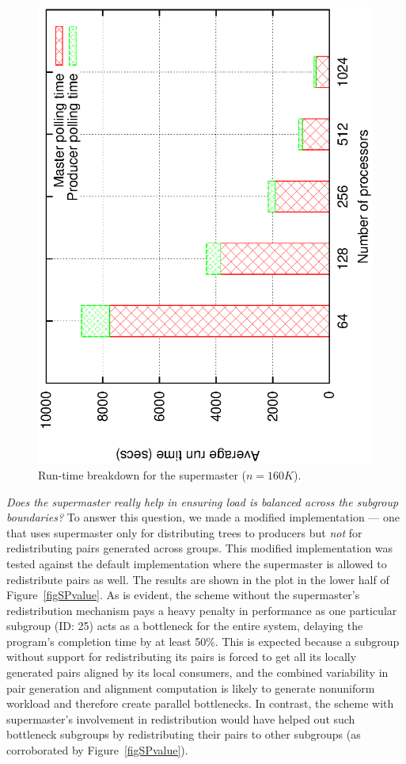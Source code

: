 \documentclass[10pt,journal,letterpaper,compsoc]{IEEEtran}
\begin{document}
\begin{figure}[thb]
\centerline{
						\includegraphics[angle=-90, scale=0.5]{spBreak.eps}
            }
\caption{
Run-time breakdown for the supermaster ($n=160K$).
}
\label{figSupermasterBreakdown}
\end{figure}

\emph{Does the supermaster really help in ensuring load is balanced across the subgroup boundaries?} To answer this question, we made a modified implementation --- one that uses supermaster only for distributing trees to producers but \emph{not} for redistributing pairs generated across groups. This modified implementation was tested against the default implementation where the supermaster is allowed to redistribute pairs as well. The results are shown in the plot in the lower half of Figure~\ref{figSPvalue}. As is evident, the scheme without the supermaster's redistribution mechanism pays a heavy penalty in performance as one particular subgroup (ID: 25) acts as a bottleneck for the entire system, delaying the program's completion time by at least 50\%. This is expected because a subgroup without support for redistributing its pairs is forced to get all its locally generated pairs aligned by its local consumers, and the combined variability in pair generation and alignment computation is likely to generate nonuniform workload and therefore create parallel bottlenecks. In contrast, the scheme with supermaster's involvement in redistribution would have helped out such bottleneck subgroups by redistributing their pairs to other subgroups (as corroborated by Figure~\ref{figSPvalue}). 
\end{document}
